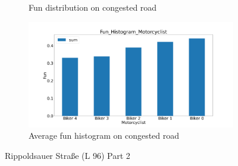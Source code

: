 \begin{figure}[H]
\begin{subfigure}[b]{0.45\textwidth}
        \caption{Fun distribution on congested road}
    \end{subfigure}
    \hfill
    \begin{subfigure}[b]{0.45\textwidth}
        \centering
    \includegraphics[width=1.0\textwidth]{images/Rippoldsauer/Rippoldsauer_Fun_Histogram_congested.png}
    \caption{Average fun histogram on congested road}
    \end{subfigure}
    \caption{Rippoldsauer Straße (L 96) Part 2}
\end{figure}


